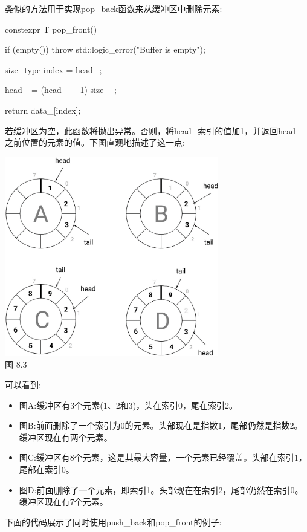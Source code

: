 类似的方法用于实现pop\_back函数来从缓冲区中删除元素:

\begin{cpp}
constexpr T pop_front()
{
	if (empty()) throw std::logic_error("Buffer is empty");
	
	size_type index = head_;
	
	head_ = (head_ + 1) %
	size_--;
	
	return data_[index];
}
\end{cpp}

若缓冲区为空，此函数将抛出异常。否则，将head\_索引的值加1，并返回head\_之前位置的元素的值。下图直观地描述了这一点:

\begin{center}
\includegraphics[width=0.7\textwidth]{images/3.png}\\
图 8.3
\end{center}

可以看到:

\begin{itemize}
\item
图A:缓冲区有3个元素(1、2和3)，头在索引0，尾在索引2。

\item
图B:前面删除了一个索引为0的元素。头部现在是指数1，尾部仍然是指数2。缓冲区现在有两个元素。

\item
图C:缓冲区有8个元素，这是其最大容量，一个元素已经覆盖。头部在索引1，尾部在索引0。

\item
图D:前面删除了一个元素，即索引1。头部现在在索引2，尾部仍然在索引0。缓冲区现在有7个元素。
\end{itemize}

下面的代码展示了同时使用push\_back和pop\_front的例子:

